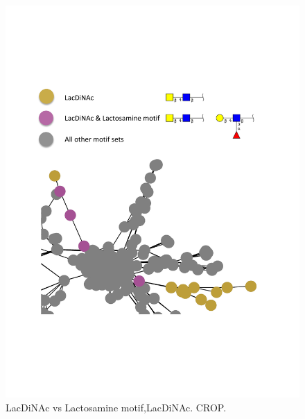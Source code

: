 \documentclass[12pt,a4paper]{article}
\begin{document}
\begin{figure}[H]
\centering 
\includegraphics[scale=0.9]{motif_similarity_exploration/LacDiNAc_vs_Lactosamine_motif_LacDiNAc.pdf} 
\caption{LacDiNAc vs Lactosamine motif,LacDiNAc. CROP.}
\label{fig:LacDiNAc_vs_Lactosamine motif,LacDiNAc}
\end{figure}
\end{document}
